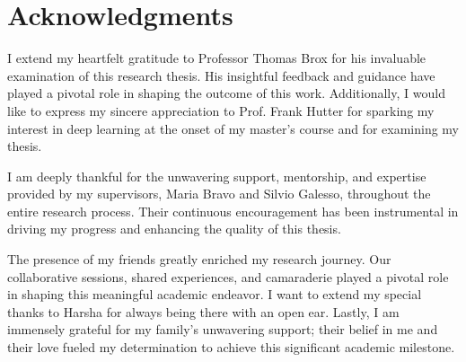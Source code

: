 \chapter{Acknowledgments}
I extend my heartfelt gratitude to Professor Thomas Brox for his invaluable examination of this research thesis. His insightful feedback and guidance have played a pivotal role in shaping the outcome of this work. Additionally, I would like to express my sincere appreciation to Prof. Frank Hutter for sparking my interest in deep learning at the onset of my master's course and for examining my thesis.

I am deeply thankful for the unwavering support, mentorship, and expertise provided by my supervisors, Maria Bravo and Silvio Galesso, throughout the entire research process. Their continuous encouragement has been instrumental in driving my progress and enhancing the quality of this thesis.

The presence of my friends greatly enriched my research journey. Our collaborative sessions, shared experiences, and camaraderie played a pivotal role in shaping this meaningful academic endeavor. I want to extend my special thanks to Harsha for always being there with an open ear. Lastly, I am immensely grateful for my family's unwavering support; their belief in me and their love fueled my determination to achieve this significant academic milestone.

%



%
